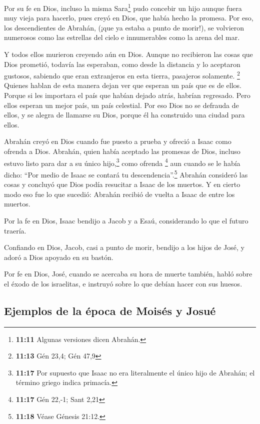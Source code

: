  Por su fe en Dios, incluso la misma Sara\footnote{\textbf{11:11}
  Algunas versiones dicen Abrahán.} pudo concebir un hijo aunque fuera
muy vieja para hacerlo, pues creyó en Dios, que había hecho la promesa.
 Por eso, los descendientes de Abrahán, (¡que ya estaba a
punto de morir!), se volvieron numerosos como las estrellas del cielo e
innumerables como la arena del mar.

 Y todos ellos murieron creyendo aún en Dios. Aunque no
recibieron las cosas que Dios prometió, todavía las esperaban, como
desde la distancia y lo aceptaron gustosos, sabiendo que eran
extranjeros en esta tierra, pasajeros solamente. \footnote{\textbf{11:13}
  Gén 23,4; Gén 47,9}  Quienes hablan de esta manera
dejan ver que esperan un país que es de ellos.  Porque si
les importara el país que habían dejado atrás, habrían regresado.
 Pero ellos esperan un mejor país, un país celestial. Por
eso Dios no se defrauda de ellos, y se alegra de llamarse su Dios,
porque él ha construido una ciudad para ellos.

 Abrahán creyó en Dios cuando fue puesto a prueba y
ofreció a Isaac como ofrenda a Dios. Abrahán, quien había aceptado las
promesas de Dios, incluso estuvo listo para dar a su único
hijo,\footnote{\textbf{11:17} Por supuesto que Isaac no era literalmente
  el único hijo de Abrahán; el término griego indica primacía.} como
ofrenda \footnote{\textbf{11:17} Gén 22,-1; Sant 2,21} 
aun cuando se le había dicho: ``Por medio de Isaac se contará tu
descendencia''.\footnote{\textbf{11:18} Véase Génesis 21:12.}
 Abrahán consideró las cosas y concluyó que Dios podía
resucitar a Isaac de los muertos. Y en cierto modo eso fue lo que
sucedió: Abrahán recibió de vuelta a Isaac de entre los muertos.

 Por la fe en Dios, Isaac bendijo a Jacob y a Esaú,
considerando lo que el futuro traería.

 Confiando en Dios, Jacob, casi a punto de morir, bendijo
a los hijos de José, y adoró a Dios apoyado en su bastón.

 Por fe en Dios, José, cuando se acercaba su hora de
muerte también, habló sobre el éxodo de los israelitas, e instruyó sobre
lo que debían hacer con sus huesos.

\hypertarget{ejemplos-de-la-uxe9poca-de-moisuxe9s-y-josuuxe9}{%
\subsection{Ejemplos de la época de Moisés y
Josué}\label{ejemplos-de-la-uxe9poca-de-moisuxe9s-y-josuuxe9}}

